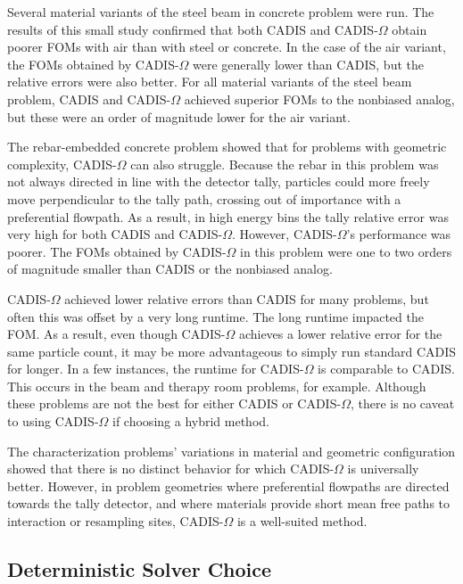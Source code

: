 Several material variants of the steel beam in concrete problem were run. The
results of this small study confirmed that both CADIS and CADIS-$\Omega$ obtain
poorer FOMs with air than with steel or concrete. In the case of the air
variant, the FOMs obtained by CADIS-$\Omega$ were generally lower than CADIS,
but the relative errors were also better. For all material variants of the steel
beam problem, CADIS and CADIS-$\Omega$ achieved superior FOMs to the nonbiased
analog, but these were an order of magnitude lower for the air variant.

The rebar-embedded concrete problem showed that for problems with
geometric complexity, CADIS-$\Omega$ can also struggle. Because the rebar in
this problem was not always directed in line with the detector tally, particles
could more freely move perpendicular to the tally path, crossing out of
importance with a preferential flowpath. As a result, in high energy bins the
tally relative error was very high for both CADIS and CADIS-$\Omega$. However,
CADIS-$\Omega$'s performance was poorer. The FOMs obtained by CADIS-$\Omega$ in
this problem were one to two orders of magnitude smaller than CADIS or the
nonbiased analog.

CADIS-$\Omega$ achieved lower relative errors than CADIS for many problems, but
often this was offset by a very long runtime. The long runtime impacted the FOM.
As a result, even though CADIS-$\Omega$ achieves a lower relative error for the
same particle count, it may be more advantageous to simply run standard CADIS
for longer. In a few instances, the runtime for CADIS-$\Omega$ is comparable to
CADIS. This occurs in the beam and therapy room problems, for example. Although
these problems are not the best for either CADIS or CADIS-$\Omega$, there is no
caveat to using CADIS-$\Omega$ if choosing a hybrid method.

The characterization problems' variations in material and geometric
configuration showed that there is no distinct behavior for which CADIS-$\Omega$
is universally better. However,
in problem geometries where preferential flowpaths are directed
towards the tally detector, and where materials provide short mean free paths to
interaction or resampling sites, CADIS-$\Omega$ is a well-suited method.

\subsection{Deterministic Solver Choice}
\label{sec:deterministic_recs}

